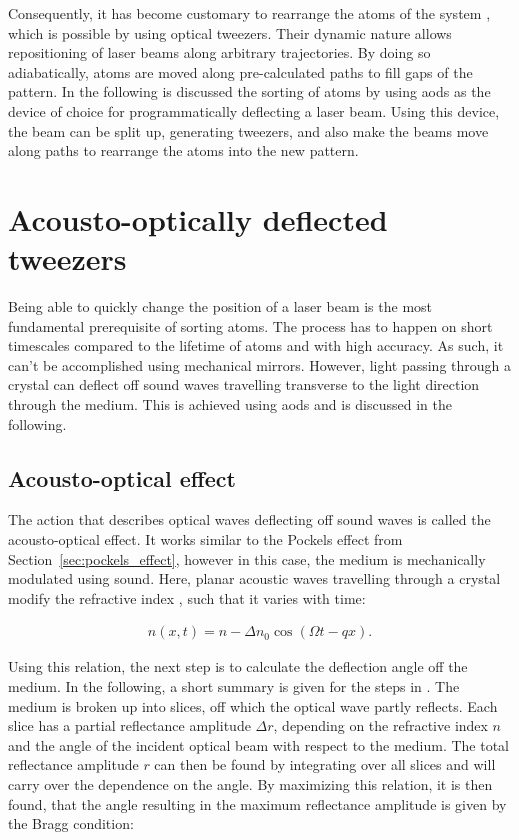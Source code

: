 Consequently, it has become customary to rearrange the atoms of the system \cite{Barredo2016, Endres2016}, which is possible by using optical tweezers. Their dynamic nature allows repositioning of laser beams along arbitrary trajectories. By doing so adiabatically, atoms are moved along pre-calculated paths to fill gaps of the pattern. In the following is discussed the sorting of atoms by using \acp{aod} as the device of choice for programmatically deflecting a laser beam. Using this device, the beam can be split up, generating tweezers, and also make the beams move along paths to rearrange the atoms into the new pattern.


\section{Acousto-optically deflected tweezers}

Being able to quickly change the position of a laser beam is the most fundamental prerequisite of sorting atoms. The process has to happen on short timescales compared to the lifetime of atoms and with high accuracy. As such, it can't be accomplished using mechanical mirrors. However, light passing through a crystal can deflect off sound waves travelling transverse to the light direction through the medium. This is achieved using \acp{aod} and is discussed in the following.

\subsection{Acousto-optical effect}

The action that describes optical waves deflecting off sound waves is called the acousto-optical effect. It works similar to the Pockels effect from Section~\ref{sec:pockels_effect}, however in this case, the medium is mechanically modulated using sound. Here, planar acoustic waves travelling through a crystal modify the refractive index \cite{Saleh1991}, such that it varies with time:

\begin{align}
	n(x, t) = n - \Delta n_0 \cos{\left(\Omega t - q x\right)}.
\end{align}

Using this relation, the next step is to calculate the deflection angle off the medium. In the following, a short summary is given for the steps in \cite{Saleh1991}. The medium is broken up into slices, off which the optical wave partly reflects. Each slice has a partial reflectance amplitude $\Delta r$, depending on the refractive index $n$ and the angle of the incident optical beam with respect to the medium. The total reflectance amplitude $r$ can then be found by integrating over all slices and will carry over the dependence on the angle. By maximizing this relation, it is then found, that the angle resulting in the maximum reflectance amplitude is given by the Bragg condition:

